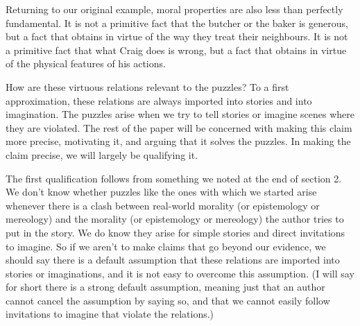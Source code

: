 Returning to our original example, moral properties are also less than perfectly fundamental. It is not a primitive fact that the butcher or the baker is generous, but a fact that obtains in virtue of the way they treat their neighbours. It is not a primitive fact that what Craig does is wrong, but a fact that obtains in virtue of the physical features of his actions. 

How are these virtuous relations relevant to the puzzles? To a first approximation, these relations are always imported into stories and into imagination. The puzzles arise when we try to tell stories or imagine scenes where they are violated. The rest of the paper will be concerned with making this claim more precise, motivating it, and arguing that it solves the puzzles. In making the claim precise, we will largely be qualifying it.

The first qualification follows from something we noted at the end of section 2. We don't know whether puzzles like the ones with which we started arise whenever there is a clash between real-world morality (or epistemology or mereology) and the morality (or epistemology or mereology) the author tries to put in the story. We do know they arise for simple stories and direct invitations to imagine. So if we aren't to make claims that go beyond our evidence, we should say there is a default assumption that these relations are imported into stories or imaginations, and it is not easy to overcome this assumption. (I will say for short there is a strong default assumption, meaning just that an author cannot cancel the assumption by saying so, and that we cannot easily follow invitations to imagine that violate the relations.)

